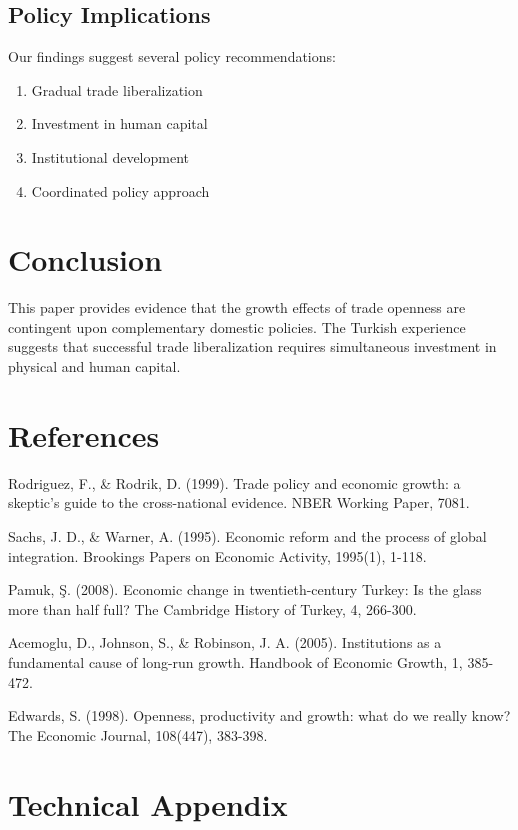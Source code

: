 \documentclass[12pt,a4paper]{article}
\theoremstyle{definition}
\begin{document}
\subsection{Policy Implications}
Our findings suggest several policy recommendations:
\begin{enumerate}
    \item Gradual trade liberalization
    \item Investment in human capital
    \item Institutional development
    \item Coordinated policy approach
\end{enumerate}

\section{Conclusion}
This paper provides evidence that the growth effects of trade openness are contingent upon complementary domestic policies. The Turkish experience suggests that successful trade liberalization requires simultaneous investment in physical and human capital.

\section{References}
\begin{thebibliography}{99}
 Rodriguez, F., \& Rodrik, D. (1999). Trade policy and economic growth: a skeptic's guide to the cross-national evidence. NBER Working Paper, 7081.

 Sachs, J. D., \& Warner, A. (1995). Economic reform and the process of global integration. Brookings Papers on Economic Activity, 1995(1), 1-118.

 Pamuk, Ş. (2008). Economic change in twentieth-century Turkey: Is the glass more than half full? The Cambridge History of Turkey, 4, 266-300.

 Acemoglu, D., Johnson, S., \& Robinson, J. A. (2005). Institutions as a fundamental cause of long-run growth. Handbook of Economic Growth, 1, 385-472.

 Edwards, S. (1998). Openness, productivity and growth: what do we really know? The Economic Journal, 108(447), 383-398.
\end{thebibliography}

\appendix
\section{Technical Appendix}
\end{document}
